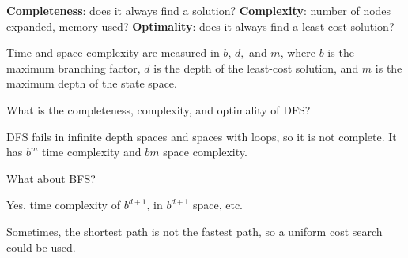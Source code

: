 \begin{definition}
	\textbf{Completeness}: does it always find a solution?
	\textbf{Complexity}: number of nodes expanded, memory used?
	\textbf{Optimality}: does it always find a least-cost solution?
\end{definition}

Time and space complexity are measured in \( b \), \( d,  \) and \( m \), where \( b \) is the maximum branching factor, \( d \) is the depth of the least-cost solution, and \( m \) is the maximum depth of the state space.

\begin{eg}
	What is the completeness, complexity, and optimality of DFS?
\end{eg}
\begin{explanation}
	DFS fails in infinite depth spaces and spaces with loops, so it is not complete. It has \( b^{m}  \) time complexity and \( bm \) space complexity.
\end{explanation}

\begin{eg}
	What about BFS?
\end{eg}
\begin{explanation}
	Yes, time complexity of \( b^{d+1}  \), in \( b^{d+1}  \) space, etc.
\end{explanation}

Sometimes, the shortest path is not the fastest path, so a uniform cost search could be used.
